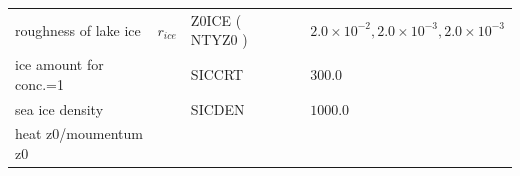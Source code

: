 \begin{longtable}[]{@{}lllll@{}}
\begin{minipage}[t]{0.19\columnwidth}
roughness of lake ice\strut
\end{minipage} & \begin{minipage}[t]{0.15\columnwidth}\raggedright
\(r_{ice}\)\strut
\end{minipage} & \begin{minipage}[t]{0.11\columnwidth}\raggedright
Z0ICE ( NTYZ0 )\strut
\end{minipage} & \begin{minipage}[t]{0.04\columnwidth}\raggedright
\strut
\end{minipage} & \begin{minipage}[t]{0.37\columnwidth}\raggedright
\(2.0\times 10^{-2}, 2.0\times 10^{-3}, 2.0\times 10^{-3}\)\strut
\end{minipage}\tabularnewline
\begin{minipage}[t]{0.19\columnwidth}\raggedright
ice amount for conc.=1\strut
\end{minipage} & \begin{minipage}[t]{0.15\columnwidth}\raggedright
\strut
\end{minipage} & \begin{minipage}[t]{0.11\columnwidth}\raggedright
SICCRT\strut
\end{minipage} & \begin{minipage}[t]{0.04\columnwidth}\raggedright
\strut
\end{minipage} & \begin{minipage}[t]{0.37\columnwidth}\raggedright
\(300.0\)\strut
\end{minipage}\tabularnewline
\begin{minipage}[t]{0.19\columnwidth}\raggedright
sea ice density\strut
\end{minipage} & \begin{minipage}[t]{0.15\columnwidth}\raggedright
\strut
\end{minipage} & \begin{minipage}[t]{0.11\columnwidth}\raggedright
SICDEN\strut
\end{minipage} & \begin{minipage}[t]{0.04\columnwidth}\raggedright
\strut
\end{minipage} & \begin{minipage}[t]{0.37\columnwidth}\raggedright
\(1000.0\)\strut
\end{minipage}\tabularnewline
\begin{minipage}[t]{0.19\columnwidth}\raggedright
heat z0/moumentum z0\strut
\end{minipage} & \begin{minipage}[t]{0.15\columnwidth}\raggedright

\end{minipage}
\end{longtable}
